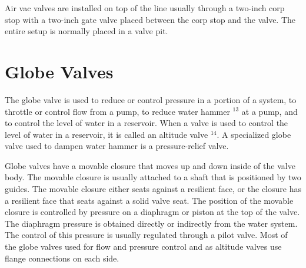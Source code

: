 \documentclass[10pt]{article}
\begin{document}
Air vac valves are installed on top of the line usually through a two-inch corp stop with a two-inch gate valve placed between the corp stop and the valve. The entire setup is normally placed in a valve pit.

\section{Globe Valves}
The globe valve is used to reduce or control pressure in a portion of a system, to throttle or control flow from a pump, to reduce water hammer ${ }^{13}$ at a pump, and to control the level of water in a reservoir. When a valve is used to control the level of water in a reservoir, it is called an altitude valve ${ }^{14}$. A specialized globe valve used to dampen water hammer is a pressure-relief valve.

Globe valves have a movable closure that moves up and down inside of the valve body. The movable closure is usually attached to a shaft that is positioned by two guides. The movable closure either seats against a resilient face, or the closure has a resilient face that seats against a solid valve seat. The position of the movable closure is controlled by pressure on a diaphragm or piston at the top of the valve. The diaphragm pressure is obtained directly or indirectly from the water system. The control of this pressure is usually regulated through a pilot valve. Most of the globe valves used for flow and pressure control and as altitude valves use flange connections on each side.
\end{document}
